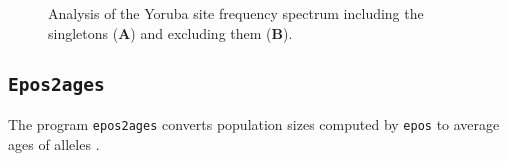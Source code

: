 \documentclass[a4paper, english]{article}
\newcommand{\ty}{\texttt}
\begin{document}
\begin{figure}
  \begin{center}
  \end{center}
  \caption{Analysis of the Yoruba site frequency spectrum including
    the singletons (\textbf{A}) and excluding them
    (\textbf{B}).}\label{fig:yri}
\end{figure}


\subsection{\ty{Epos2ages}}
The program \ty{epos2ages} converts population sizes computed by
\ty{epos} to average ages of alleles \citep{lyn19:inf}.
\end{document}
